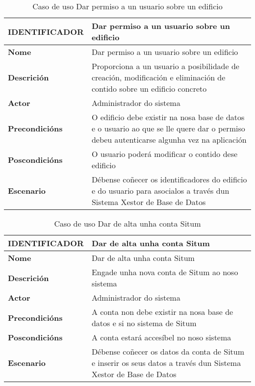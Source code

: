 \begin{table}[tbp]
	\begin{tabular}{|l|p{10cm}|}
		\hline 
		\textbf{IDENTIFICADOR}	& \textbf{Dar permiso a un usuario sobre un edificio} \\ 
		\hline 
		\textbf{Nome} & Dar permiso a un usuario sobre un edificio \\ 
		\hline 
		\textbf{Descrición} & Proporciona a un usuario a posibilidade de creación, modificación e eliminación de contido sobre un edificio concreto \\ 
		\hline 
		\textbf{Actor} & Administrador do sistema \\ 
		\hline 
		\textbf{Precondicións} & O edificio debe existir na nosa base de datos e o usuario ao que se lle quere dar o permiso debeu autenticarse algunha vez na aplicación \\ 
		\hline 
		\textbf{Poscondicións} & O usuario poderá modificar o contido dese edificio \\ 
		\hline 
		\textbf{Escenario} & Débense coñecer os identificadores do edificio e do usuario para asocialos a través dun Sistema Xestor de Base de Datos \\ 
		\hline 
	\end{tabular}
	\caption{Caso de uso Dar permiso a un usuario sobre un edificio}
	\label{tab:cuDarPermisoUsuarioEdificio}
\end{table}

\begin{table}[tbp]
	\begin{tabular}{|l|p{10cm}|}
		\hline 
		\textbf{IDENTIFICADOR}	& \textbf{Dar de alta unha conta Situm} \\ 
		\hline 
		\textbf{Nome} & Dar de alta unha conta Situm \\ 
		\hline 
		\textbf{Descrición} & Engade unha nova conta de Situm ao noso sistema \\ 
		\hline 
		\textbf{Actor} & Administrador do sistema \\ 
		\hline 
		\textbf{Precondicións} & A conta non debe existir na nosa base de datos e si no sistema de Situm \\ 
		\hline 
		\textbf{Poscondicións} & A conta estará accesíbel no noso sistema \\ 
		\hline 
		\textbf{Escenario} & Débense coñecer os datos da conta de Situm e inserir os seus datos a través dun Sistema Xestor de Base de Datos \\ 
		\hline 
	\end{tabular}
	\caption{Caso de uso Dar de alta unha conta Situm}
	\label{tab:cuDarAltaContaSitum}
\end{table}

